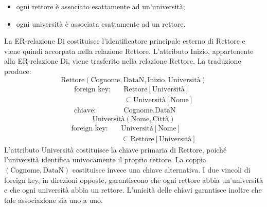 \begin{itemize}
    \item ogni rettore è associato esattamente
    ad un'università;

    \item ogni università è associata
    esattamente ad un rettore.
\end{itemize}
\noindent
La ER-relazione Di costituisce l'identificatore
principale esterno di Rettore e viene quindi
accorpata nella relazione Rettore.
L'attributo Inizio, appartenente alla
ER-relazione Di, viene trasferito nella
relazione Rettore.
La traduzione produce:
\[
\text{Rettore}(
\text{Cognome},\text{DataN},\text{Inizio},
\underline{\text{Università}})
\]
\[
\begin{aligned}
\text{foreign key:}\quad
&\text{Rettore}[\text{Università}]\\
&\subseteq \text{Università}[\text{Nome}]\\
\text{chiave:}\quad
&\text{Cognome},\text{DataN}
\end{aligned}
\]
\[
\text{Università}(\underline{\text{Nome}},
\text{Città})
\]
\[
\begin{aligned}
\text{foreign key:}\quad
&\text{Università}[\text{Nome}]\\
&\subseteq \text{Rettore}[\text{Università}]
\end{aligned}
\]
\noindent
L'attributo Università costituisce la chiave
primaria di Rettore, poiché l'università
identifica univocamente il proprio rettore.
La coppia $(\text{Cognome},\text{DataN})$
costituisce invece una chiave alternativa.
I due vincoli di foreign key, in direzioni
opposte, garantiscono che ogni rettore abbia
un'università e che ogni università abbia
un rettore.
L'unicità delle chiavi garantisce inoltre
che tale associazione sia uno a uno.


